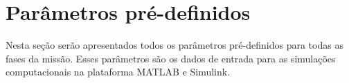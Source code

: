 \section{Parâmetros pré-definidos}

Nesta seção serão apresentados todos os parâmetros pré-definidos para todas as fases da missão.
Esses parâmetros são os dados de entrada para as simulações computacionais na plataforma MATLAB e Simulink.


